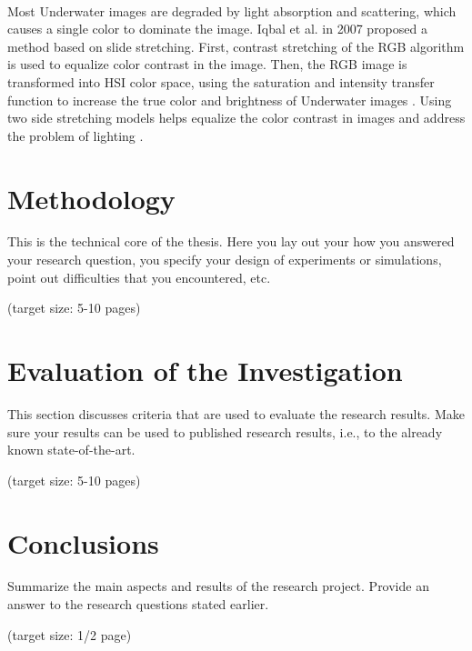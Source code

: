 \documentclass[a4paper,11pt,oneside]{article}
\begin{document}
  \\
  Most Underwater images are degraded by light absorption and scattering, which causes a single color to dominate the image. Iqbal et al. in 2007 \cite{4} proposed a method based on slide stretching. First, contrast stretching of the RGB algorithm is used to equalize color contrast in the image. Then, the RGB image is transformed into HSI color space, using the saturation and intensity transfer function to increase the true color and brightness of Underwater images \cite{4}. Using two side stretching models helps equalize the color contrast in images and address the problem of lighting \cite{4}.
 
  \section{Methodology}
  \label{sec:3}
  This is the technical core of the thesis. Here you lay out your how
  you answered your research question, you specify your design of
  experiments or simulations, point out difficulties that you
  encountered, etc.

  (target size: 5-10 pages)
  
  \section{Evaluation of the Investigation}
  \label{sec:4}

  This section discusses criteria that are used to evaluate the
  research results. Make sure your results can be used to published
  research results, i.e., to the already known state-of-the-art.

  (target size: 5-10 pages)


\section{Conclusions}
\label{sec:5}

  Summarize the main aspects and results of the research
  project. Provide an answer to the research questions stated earlier.

  (target size: 1/2 page)
  
  \newpage
  
  \printbibliography
  
\end{document}
